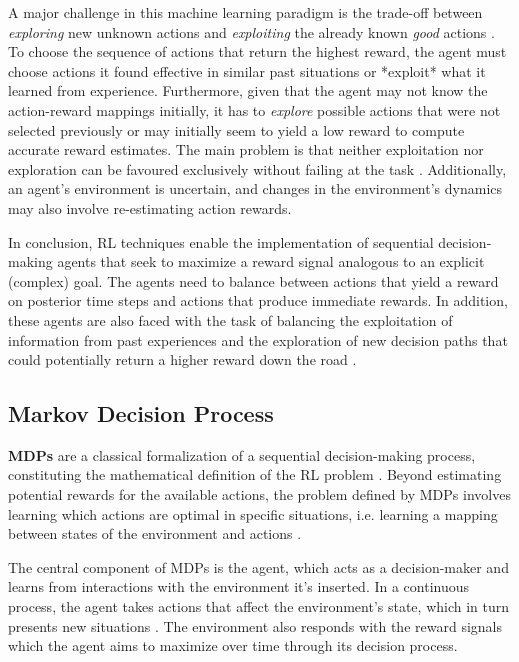 A major challenge in this machine learning paradigm is the trade-off between \textit{exploring} new unknown actions and \textit{exploiting} the already known \textit{good} actions \cite{suttonReinforcementLearningIntroduction2014}. To choose the sequence of actions that return the highest reward, the agent must choose actions it found effective in similar past situations or *exploit* what it learned from experience. Furthermore, given that the agent may not know the action-reward mappings initially, it has to \textit{explore} possible actions that were not selected previously or may initially seem to yield a low reward to compute accurate reward estimates. The main problem is that neither exploitation nor exploration can be favoured exclusively without failing at the task \cite{suttonReinforcementLearningIntroduction2014}. Additionally, an agent's environment is uncertain, and changes in the environment's dynamics may also involve re-estimating action rewards. \par


In conclusion, \ac{RL} techniques enable the implementation of sequential decision-making agents that seek to maximize a reward signal analogous to an explicit (complex) goal. The agents need to balance between actions that yield a reward on posterior time steps and actions that produce immediate rewards. In addition, these agents are also faced with the task of balancing the exploitation of information from past experiences and the exploration of new decision paths that could potentially return a higher reward down the road \cite{suttonReinforcementLearningIntroduction2014}.  \par



\subsection{Markov Decision Process} \label{sec:back-mpd}
\textbf{\acfp{MDP}} are a classical formalization of a sequential decision-making process, constituting the mathematical definition of the \ac{RL} problem \cite{suttonReinforcementLearningIntroduction2014, moralesGrokkingDeepReinforcement2020}. Beyond estimating potential rewards for the available actions, the problem defined by \acp{MDP} involves learning which actions are optimal in specific situations, i.e. learning a mapping between states of the environment and actions \cite{suttonReinforcementLearningIntroduction2014}. 

The central component of \acp{MDP} is the agent, which acts as a decision-maker and learns from interactions with the environment it's inserted. In a continuous process, the agent takes actions that affect the environment's state, which in turn presents new situations \cite{suttonReinforcementLearningIntroduction2014}. The environment also responds with the reward signals which the agent aims to maximize over time through its decision process.

